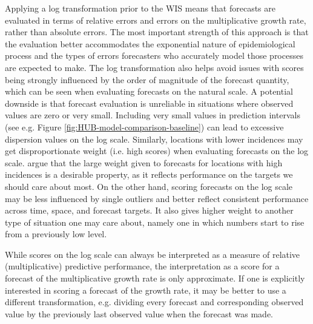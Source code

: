 \documentclass{article}
\begin{document}
Applying a log transformation prior to the WIS means that forecasts are evaluated in terms of relative errors and errors on the multiplicative growth rate, rather than absolute errors. The most important strength of this approach is that the evaluation better accommodates the exponential nature of epidemiological process and the types of errors forecasters who accurately model those processes are expected to make. The log transformation also helps avoid issues with scores being strongly influenced by the order of magnitude of the forecast quantity, which can be seen when evaluating forecasts on the natural scale. 
A potential downside is that forecast evaluation is unreliable in situations where observed values are zero or very small. Including very small values in prediction intervals (see e.g. Figure \ref{fig:HUB-model-comparison-baseline}) can lead to excessive dispersion values on the log scale. 
Similarly, locations with lower incidences may get disproportionate weight (i.e. high scores) when evaluating forecasts on the log scale. \cite{bracherEvaluatingEpidemicForecasts2021} argue that the large weight given to forecasts for locations with high incidences is a desirable property, as it reflects performance on the targets we should care about most. On the other hand, scoring forecasts on the log scale may be less influenced by single outliers and better reflect consistent performance across time, space, and forecast targets. It also gives higher weight to another type of situation one may care about, namely one in which numbers start to rise from a previously low level. 



While scores on the log scale can always be interpreted as a measure of relative (multiplicative) predictive performance, the interpretation as a score for a forecast of the multiplicative growth rate is only approximate. If one is explicitly interested in scoring a forecast of the growth rate, it may be better to use a different transformation, e.g. dividing every forecast and corresponding observed value by the previously last observed value when the forecast was made. 
\end{document}
